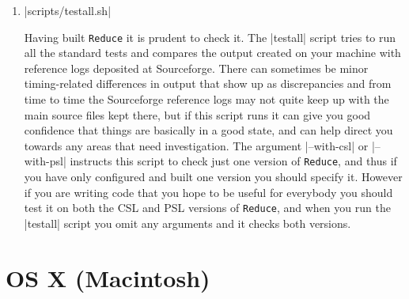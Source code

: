 \documentclass[12pt,twoside,openright]{memoir}
\newcommand{\reduce}{\texttt{Reduce}\xspace}
\begin{document}
\begin{enumerate}
It is perhaps proper to be aware that a version of the \reduce sources
fetched from the subversion repository will be the latest and most up to
date set of files you can obtain, and is liable to have corrections to
issues that have been raised -- however sometimes it may be in a transitional
state when a change has been made that is intended to fix problems but that
in fact introduces others. If you encounter difficulties you may wish to
browse the repository records on sourceforge to see which files have changed
recently and consider whether the problem you observe might relate to that.
It has also been the case in the past that if you update or replace your
operating system that can occasionally introduce incompatibilities. This is
particularly true of you install a very new version of an operating system that
other developers may not yet have had time to investigate. Please
report problems so that they can be fixed not just for you but for
everybody.

\item |scripts/testall.sh|

Having built \reduce it is prudent to check it. The |testall| script tries
to run all the standard tests and compares the output created on your
machine with reference logs deposited at Sourceforge. There can sometimes
be minor timing-related differences in output that show up as discrepancies
and from time to time the Sourceforge reference logs may not quite keep up
with the main source files kept there, but if this script runs it can
give you good confidence that things are basically in a good state, and can
help direct you towards any areas that need investigation. The argument
|--with-csl| or |--with-psl|  instructs this script to check just one
version of \reduce, and thus if you have only configured and built one
version you should specify it. However if you are writing code that
you hope to be useful for everybody you should test it on both the CSL and
PSL versions of \reduce, and when you run the |testall| script you omit any
arguments and it checks both versions.

\end{enumerate}

\section{OS X (Macintosh)}
\end{document}
